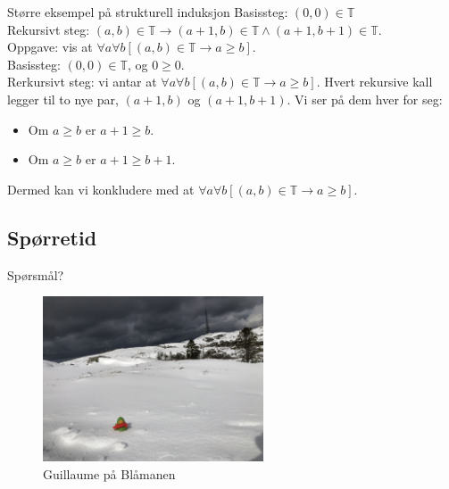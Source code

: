 \begin{frame}{Større eksempel på strukturell induksjon}
    Basissteg: $(0, 0) \in \mathbb{T}$\\
    Rekursivt steg: $(a, b) \in \mathbb{T} \rightarrow (a+1, b) \in \mathbb{T} \land (a+1, b+1) \in \mathbb{T}$.\\
    
    Oppgave: vis at $\forall a \forall b [(a, b) \in \mathbb{T} \rightarrow a \geq b]$.\\
    
    \pause
    Basissteg: $(0, 0) \in \mathbb{T}$, og $0 \geq 0$. \checkmark\\
    Rerkursivt steg: vi antar at $\forall a \forall b [(a, b) \in \mathbb{T} \rightarrow a \geq b]$. Hvert rekursive kall legger til to nye par, $(a+1, b)$ og $(a+1, b+1)$. Vi ser på dem hver for seg:
    \begin{itemize}
        \item Om $a \geq b$ er $a+1 \geq b$.
        \item Om $a \geq b$ er $a+1 \geq b+1$. \checkmark
    \end{itemize}
    Dermed kan vi konkludere med at $\forall a \forall b [(a, b) \in \mathbb{T} \rightarrow a \geq b]$.
\end{frame}

\subsection*{Spørretid}
\begin{frame}{Spørsmål?}
    \begin{figure}
        \centering
        \includegraphics[height = 4.9cm]{images/guillaume7.jpg}
        \caption{Guillaume på Blåmanen}
        \label{fig:guillaume7a}
    \end{figure}
\end{frame}